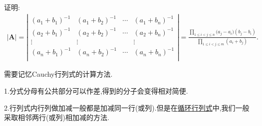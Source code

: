 \documentclass[../../main.tex]{subfiles}%
\begin{document}
\begin{proposition}\label{Cauchy行列式}
证明:
\begin{gather}
|\boldsymbol{A}|=\left| \begin{matrix}
(a_1+b_1)^{-1}&		(a_1+b_2)^{-1}&		\cdots&		(a_1+b_n)^{-1}\\
(a_2+b_1)^{-1}&		(a_2+b_2)^{-1}&		\cdots&		(a_2+b_n)^{-1}\\
\vdots&		\vdots&		&		\vdots\\
(a_n+b_1)^{-1}&		(a_n+b_2)^{-1}&		\cdots&		(a_n+b_n)^{-1}\\
\end{matrix} \right|=\frac{\prod\limits_{1\leqslant i<j\leqslant n}{(a_j}-a_i)(b_j-b_i)}{\prod\limits_{1\leqslant i<j\leqslant m}{\left( a_i+b_j \right)}}.
\nonumber
\end{gather}
\end{proposition}
\begin{note}
需要记忆Cauchy行列式的计算方法.

1.分式分母有公共部分可以作差,得到的分子会变得相对简便.

2.行列式内行列做加减一般都是加减同一行(或列).但是在\hyperlink{循环行列式}{循环行列式}中,我们一般采取相邻两行(或列)相加减的方法.
\end{note}
\end{document}
